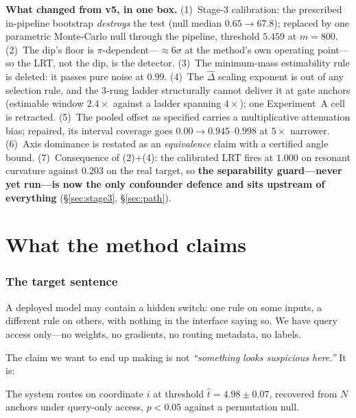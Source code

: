 \documentclass[11pt]{article}
\newcommand{\that}{\hat{t}}
\newcommand{\Dhat}{\hat{\Delta}}
\begin{document}
\vspace{0.5em}

\begin{notebox}
\textbf{\sffamily What changed from v5, in one box.} (1)~Stage-3 calibration: the prescribed
in-pipeline bootstrap \emph{destroys} the test (null median $0.65 \to 67.8$); replaced by one
parametric Monte-Carlo null through the pipeline, threshold $\mathbf{5.459}$ at $m = 800$.
(2)~The dip's floor is $\pi$-dependent---${\approx}6\sigma$ at the method's own operating
point---so the LRT, not the dip, is the detector. (3)~The minimum-mass estimability rule is
deleted: it passes pure noise at $0.99$. (4)~The $\Dhat$ scaling exponent is out of any
selection rule, and the 3-rung ladder structurally cannot deliver it at gate anchors (estimable
window $2.4\times$ against a ladder spanning $4\times$); one Experiment~A cell is retracted.
(5)~The pooled offset as specified carries a multiplicative attenuation bias; repaired, its
interval coverage goes $0.00 \to 0.945$--$0.998$ at $5\times$ narrower. (6)~Axis dominance is
restated as an \emph{equivalence} claim with a certified angle bound. (7)~Consequence of
(2)+(4): the calibrated LRT fires at $1.000$ on resonant curvature against $0.203$ on the real
target, so \textbf{the separability guard---never yet run---is now the only confounder defence
and sits upstream of everything} (\S\ref{sec:stage3}, \S\ref{sec:path}).
\end{notebox}

\vspace{0.3em}

\part{What the method claims}

\section{The target sentence}
\label{sec:target}

A deployed model may contain a hidden switch: one rule on some inputs, a different rule on
others, with nothing in the interface saying so. We have query access only---no weights, no
gradients, no routing metadata, no labels.

The claim we want to end up making is not \emph{``something looks suspicious here.''} It is:

\begin{claimbox}
\noindent The system routes on coordinate $i$ at threshold $\that = 4.98 \pm 0.07$, recovered
from $N$ anchors under query-only access, $p < 0.05$ against a permutation null.
\end{claimbox}
\end{document}
